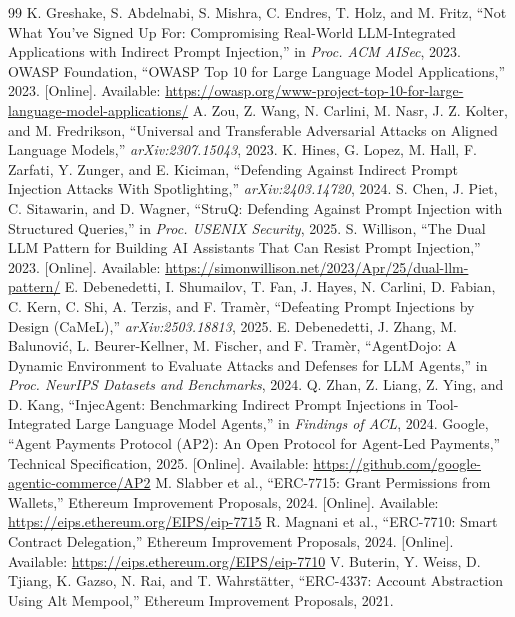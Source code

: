 \documentclass[10pt,twocolumn,letterpaper]{article}
\begin{document}
\begin{thebibliography}{99}
 K. Greshake, S. Abdelnabi, S. Mishra, C. Endres, T. Holz, and M. Fritz, ``Not What You've Signed Up For: Compromising Real-World LLM-Integrated Applications with Indirect Prompt Injection,'' in \textit{Proc. ACM AISec}, 2023.
 OWASP Foundation, ``OWASP Top 10 for Large Language Model Applications,'' 2023. [Online]. Available: \url{https://owasp.org/www-project-top-10-for-large-language-model-applications/}
 A. Zou, Z. Wang, N. Carlini, M. Nasr, J. Z. Kolter, and M. Fredrikson, ``Universal and Transferable Adversarial Attacks on Aligned Language Models,'' \textit{arXiv:2307.15043}, 2023.
 K. Hines, G. Lopez, M. Hall, F. Zarfati, Y. Zunger, and E. Kiciman, ``Defending Against Indirect Prompt Injection Attacks With Spotlighting,'' \textit{arXiv:2403.14720}, 2024.
 S. Chen, J. Piet, C. Sitawarin, and D. Wagner, ``StruQ: Defending Against Prompt Injection with Structured Queries,'' in \textit{Proc. USENIX Security}, 2025.
 S. Willison, ``The Dual LLM Pattern for Building AI Assistants That Can Resist Prompt Injection,'' 2023. [Online]. Available: \url{https://simonwillison.net/2023/Apr/25/dual-llm-pattern/}
 E. Debenedetti, I. Shumailov, T. Fan, J. Hayes, N. Carlini, D. Fabian, C. Kern, C. Shi, A. Terzis, and F. Tram\`er, ``Defeating Prompt Injections by Design (CaMeL),'' \textit{arXiv:2503.18813}, 2025.
 E. Debenedetti, J. Zhang, M. Balunovi\'c, L. Beurer-Kellner, M. Fischer, and F. Tram\`er, ``AgentDojo: A Dynamic Environment to Evaluate Attacks and Defenses for LLM Agents,'' in \textit{Proc. NeurIPS Datasets and Benchmarks}, 2024.
 Q. Zhan, Z. Liang, Z. Ying, and D. Kang, ``InjecAgent: Benchmarking Indirect Prompt Injections in Tool-Integrated Large Language Model Agents,'' in \textit{Findings of ACL}, 2024.
 Google, ``Agent Payments Protocol (AP2): An Open Protocol for Agent-Led Payments,'' Technical Specification, 2025. [Online]. Available: \url{https://github.com/google-agentic-commerce/AP2}
 M. Slabber et al., ``ERC-7715: Grant Permissions from Wallets,'' Ethereum Improvement Proposals, 2024. [Online]. Available: \url{https://eips.ethereum.org/EIPS/eip-7715}
 R. Magnani et al., ``ERC-7710: Smart Contract Delegation,'' Ethereum Improvement Proposals, 2024. [Online]. Available: \url{https://eips.ethereum.org/EIPS/eip-7710}
 V. Buterin, Y. Weiss, D. Tjiang, K. Gazso, N. Rai, and T. Wahrst\"atter, ``ERC-4337: Account Abstraction Using Alt Mempool,'' Ethereum Improvement Proposals, 2021.

\end{thebibliography}
\end{document}
